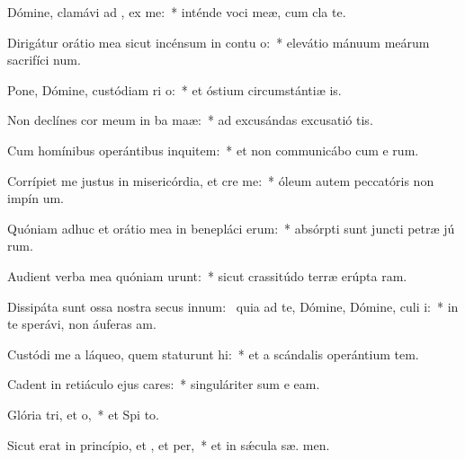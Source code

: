 \item Dómine, clamávi ad , ex me:~* inténde voci meæ, cum cla  te.
\item Dirigátur orátio mea sicut incénsum in contu o:~* elevátio mánuum meárum sacrifíci num.
\item Pone, Dómine, custódiam ri o:~* et óstium circumstántiæ  is.
\item Non declínes cor meum in ba maæ:~* ad excusándas excusatió  tis.
\item Cum homínibus operántibus inquitem:~* et non communicábo cum e rum.
\item Corrípiet me justus in misericórdia, et cre me:~* óleum autem peccatóris non impín  um.
\item Quóniam adhuc et orátio mea in benepláci erum:~* absórpti sunt juncti petræ jú rum.
\item Audient verba mea quóniam urunt:~* sicut crassitúdo terræ erúpta   ram.
\item Dissipáta sunt ossa nostra secus innum:~\pscross{} quia ad te, Dómine, Dómine, culi i:~* in te sperávi, non áuferas  am.
\item Custódi me a láqueo, quem staturunt hi:~* et a scándalis operántium tem.
\item Cadent in retiáculo ejus cares:~* singuláriter sum e  eam.
\item Glória tri, et o,~* et Spi to.
\item Sicut erat in princípio, et , et per,~* et in sǽcula sæ. men.
